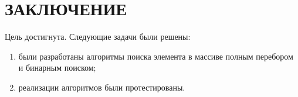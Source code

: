 \chapter*{\centering ЗАКЛЮЧЕНИЕ}

Цель достигнута. Следующие задачи были решены:
\begin{enumerate}[label=\arabic*)]
	\item были разработаны алгоритмы поиска элемента в массиве полным перебором и бинарным поиском;
	\item реализации алгоритмов были протестированы.
\end{enumerate}